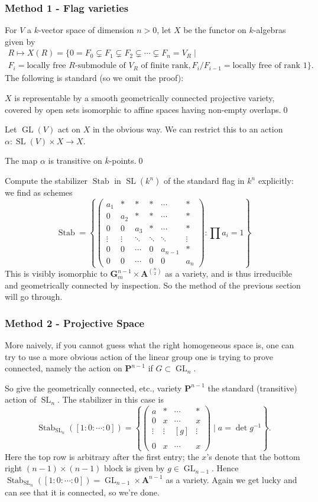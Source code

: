 \documentclass[10pt]{article}
\newcommand{\F}{\mathscr{F}}
\renewcommand{\AA}{\mathbf{A}}
\newcommand{\PP}{\mathbf{P}}
\newcommand{\GL}{\operatorname{GL}}
\newcommand{\SL}{\operatorname{SL}}
\renewcommand{\(}{\left(}
\renewcommand{\)}{\right)}
\renewcommand{\bar}{\overline}
\newcommand{\Stab}{\operatorname{Stab}}
\numberwithin{thm}{subsection}
\begin{document}
\subsubsection{Method 1 - Flag varieties}
For $V$ a $k$-vector space of dimension $n> 0$, let $X$ be the functor on $k$-algebras given by
\begin{multline*}
R\mapsto X(R)=\{0= F_0\subsetneq F_1\subsetneq F_2\subsetneq\cdots\subsetneq F_n=V_R\mid \\F_i=\text{locally free $R$-submodule of $V_R$ of finite rank},
F_i/F_{i-1}=\text{locally free of rank $1$}\}.\end{multline*}
The following is standard (so we omit the proof): 
\begin{prop}$X$ is representable by a smooth geometrically connected projective variety, covered by 
open sets isomorphic to affine spaces having non-empty overlaps.\qed\end{prop}
Let $\GL(V)$ act on $X$ in the obvious way.
We can restrict this to an action $\alpha:\SL(V)\times X\to X$.
\begin{claim}[Exercise] The map $\alpha$ is transitive on $\bar k$-points.\qed
\end{claim}
Compute the stabilizer $\Stab$ in $\SL(k^n)$ of the standard flag in $k^n$ explicitly: we find as schemes 
\[\Stab=\left\{\(\begin{smallmatrix}a_1&*&*&*&\cdots&*\\0&a_2&*&*&\cdots&*\\
0&0&a_3&*&\cdots&*\\
\vdots&\vdots&\ddots&\ddots&\ddots&\vdots\\
0&0&\cdots&0&a_{n-1}&*\\
0&0&\cdots&0&0&a_n\end{smallmatrix}\):\prod a_i=1\right\}\]
This is visibly isomorphic to $\mathbf{G}_m^{n-1}\times \AA^{\binom{n}{2}}$ as a variety,
and is thus irreducible and geometrically connected by inspection.
So the method of the previous section will go through.
\subsubsection{Method 2 - Projective Space}
More naively, if you cannot guess what the right homogeneous space is,
one can try to use a more obvious action of the linear group one is trying to prove connected, namely the action on $\PP^{n-1}$ if $G\subset \GL_n$.

So give the geometrically connected, etc., variety $\PP^{n-1}$ the standard
(transitive) action of $\SL_n$.
The stabilizer in this case is
\[\Stab_{\SL_n}([1:0:\cdots:0])=\left\{\(\begin{smallmatrix}a&*&\cdots&*\\
0&x&\cdots&x\\
\vdots&\vdots&[g]&\vdots\\ \\
0&x&\cdots&x\end{smallmatrix}\)\mid a=\det g^{-1}\right\}.\]
Here the top row is arbitrary after the first entry;
the $x$'s denote that the bottom right $(n-1)\times(n-1)$ block
is given by $g\in \GL_{n-1}$.
Hence $\Stab_{\SL_n}([1:0:\cdots:0])=\GL_{n-1}\times \AA^{n-1}$ as a variety.
Again we get lucky and can see that it is connected, so we're done.
\end{document}
